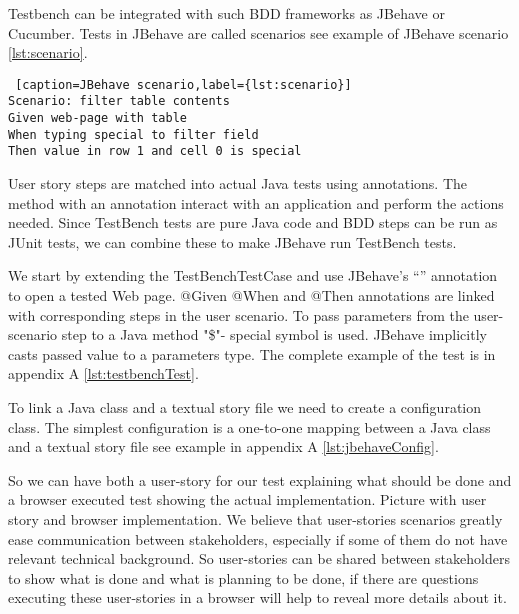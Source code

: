 Testbench can be integrated with such BDD frameworks as JBehave or Cucumber.
Tests in JBehave are called scenarios see example of JBehave scenario
\ref{lst:scenario}.

 \lstset{style=console}
  \begin{lstlisting} [caption=JBehave scenario,label={lst:scenario}]
Scenario: filter table contents
Given web-page with table
When typing special to filter field
Then value in row 1 and cell 0 is special
  \end{lstlisting}
User story steps are matched into actual Java tests using annotations. 
The method with an annotation interact with an application and perform the actions needed.
Since TestBench tests are pure Java code and BDD steps can be run as JUnit tests, we can combine these to make
JBehave run TestBench tests.

We start by extending the TestBenchTestCase  and use JBehave's ``\@BeforeScenario''
annotation to open a tested Web page.  @Given @When and @Then annotations are
linked with corresponding steps in the user scenario.
To pass parameters from the user-scenario step to a Java method "\$"- special symbol is used.
JBehave implicitly casts passed value to a parameters type. The complete example
of the test is in appendix A \ref{lst:testbenchTest}.

To link a Java class and a textual story file we need to create a configuration class.
The simplest configuration is a one-to-one mapping between a Java class and a textual story file
see example in appendix A \ref{lst:jbehaveConfig}. 

So we can have both a user-story for our test explaining what should be done and a browser executed
test showing the actual implementation. Picture with user story and browser implementation. We believe that user-stories 
scenarios greatly ease communication between stakeholders, 
especially if some of them do not have relevant technical background.
So user-stories can be shared between stakeholders to show what is done and what
is planning to be done, if there are questions 
executing these user-stories in a browser will help to reveal more details about it. 
   

    
